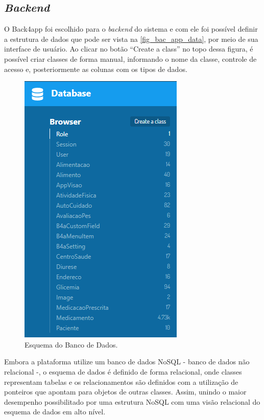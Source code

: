 \subsection{\emph{Backend}}

O Back4app foi escolhido para o \emph{backend} do sistema e com ele foi possível definir a estrutura de dados que pode
ser vista na \autoref{fig_bac_app_data}, por meio de sua interface de usuário. Ao clicar no botão ``Create a class'' no topo dessa figura,
é possível criar classes de forma manual, informando o nome da classe, controle de acesso e, posteriormente as colunas com os tipos de dados.

\begin{figure}[htb]
    \caption{\label{fig_bac_app_data}Esquema do Banco de Dados.}
    \begin{center}
        \includegraphics[scale=1.1]{Imagens/desenvolvimento/back4app_database.png}
    \end{center}
\end{figure}

Embora a plataforma utilize um banco de dados NoSQL - banco de dados não relacional -, o esquema de dados
é definido de forma relacional, onde classes representam tabelas e os relacionamentos são definidos com a utilização
de ponteiros que apontam para objetos de outras classes. Assim, unindo o maior desempenho possibilitado por uma
estrutura NoSQL com uma visão relacional do esquema de dados em alto nível.

